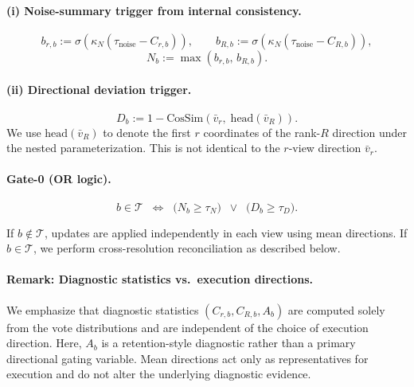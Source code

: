 \documentclass{article}
\begin{document}
\paragraph{(i) Noise-summary trigger from internal consistency.}
\begin{equation}
\label{eq:noise-gates}
b_{r,b} := \sigma\!\left(\kappa_N(\tau_{\mathrm{noise}} - C_{r,b})\right),
\qquad
b_{R,b} := \sigma\!\left(\kappa_N(\tau_{\mathrm{noise}} - C_{R,b})\right),
\end{equation}
\begin{equation}
\label{eq:noise-summary}
N_b := \max(b_{r,b},\, b_{R,b}).
\end{equation}

\paragraph{(ii) Directional deviation trigger.}
\begin{equation}
\label{eq:direction-deviation-raw}
D_b := 1 - \mathrm{CosSim}\!\left(\bar v_r,\; \mathrm{head}(\bar v_R)\right).
\end{equation}
We use $\mathrm{head}(\bar v_R)$ to denote the first $r$ coordinates
of the rank-$R$ direction under the nested parameterization.
This is not identical to the $r$-view direction $\bar v_r$.

\paragraph{Gate-0 (OR logic).}
\begin{equation}
\label{eq:gate0-final}
b \in \mathcal{T}
\;\;\Longleftrightarrow\;\;
\Big(N_b \ge \tau_N\Big)
\;\;\lor\;\;
\Big(D_b \ge \tau_D\Big).
\end{equation}

\noindent
If $b\notin\mathcal{T}$, updates are applied independently in each view
using mean directions.
If $b\in\mathcal{T}$, we perform cross-resolution reconciliation
as described below.

\paragraph{Remark: Diagnostic statistics vs.\ execution directions.}
We emphasize that diagnostic statistics $(C_{r,b}, C_{R,b}, A_b)$
are computed solely from the vote distributions and are independent of
the choice of execution direction.
Here, $A_b$ is a retention-style diagnostic rather than a primary directional gating variable.
Mean directions act only as representatives for execution and do not
alter the underlying diagnostic evidence.
\end{document}
